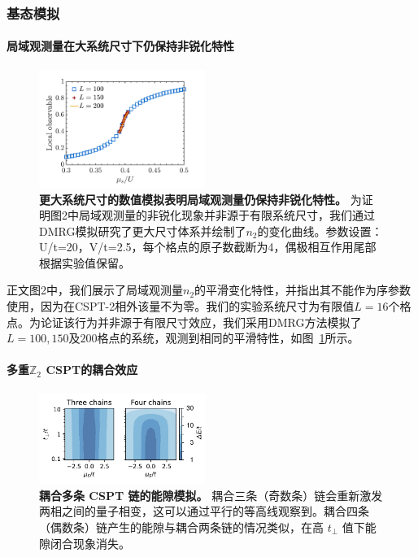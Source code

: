\documentclass[preprint,superscriptaddress,floatfix, nofootinbib]{revtex4-2}
\begin{document}
\subsubsection*{基态模拟}

\paragraph*{局域观测量在大系统尺寸下仍保持非锐化特性}

\begin{figure}
    \centering
    \includegraphics[width=0.48\textwidth]{figures/large_size_local_observable.pdf}
    \caption{\textbf{更大系统尺寸的数值模拟表明局域观测量仍保持非锐化特性。} 为证明图2中局域观测量的非锐化现象并非源于有限系统尺寸，我们通过DMRG模拟研究了更大尺寸体系并绘制了$n_2$的变化曲线。参数设置：U/t=20，V/t=2.5，每个格点的原子数截断为4，偶极相互作用尾部根据实验值保留。}
    \label{fig: large_size_local_observable}
\end{figure}

正文图2中，我们展示了局域观测量$n_2$的平滑变化特性，并指出其不能作为序参数使用，因为在CSPT-2相外该量不为零。我们的实验系统尺寸为有限值$L=16$个格点。为论证该行为并非源于有限尺寸效应，我们采用DMRG方法模拟了$L=100, 150$及$200$格点的系统，观测到相同的平滑特性，如图~\ref{fig: large_size_local_observable}所示。

\paragraph*{多重$\mathbb{Z}_2$ CSPT的耦合效应}

\begin{figure}
    \centering
    \includegraphics[width=0.48\textwidth]{figures/three_or_more_coupled_chains.pdf}
    \caption{\textbf{耦合多条 CSPT 链的能隙模拟。} 耦合三条（奇数条）链会重新激发两相之间的量子相变，这可以通过平行的等高线观察到。耦合四条（偶数条）链产生的能隙与耦合两条链的情况类似，在高 $t_\perp$ 值下能隙闭合现象消失。
    }
    \label{fig: three_or_more_coupled_chains}
\end{figure}
\end{document}
